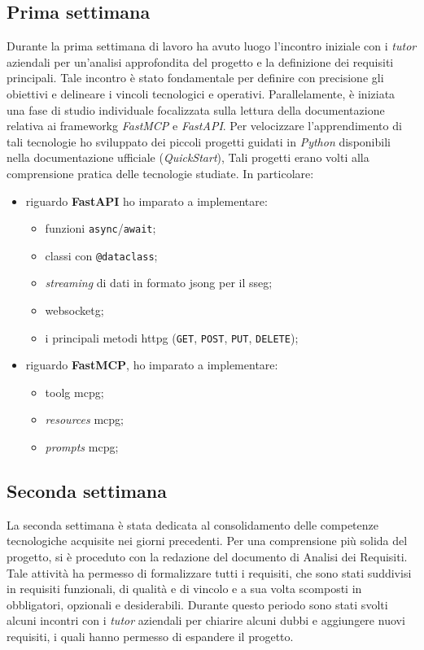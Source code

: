 \subsection{Prima settimana}
Durante la prima settimana di lavoro ha avuto luogo l'incontro iniziale con i 
\textit{tutor} aziendali per un'analisi approfondita del progetto e la definizione 
dei requisiti principali. Tale incontro è stato fondamentale per definire con precisione 
gli obiettivi e delineare i vincoli tecnologici e operativi. 
Parallelamente, è iniziata una fase di studio individuale focalizzata 
sulla lettura della documentazione relativa ai \gls{frameworkg} 
\textit{FastMCP} e \textit{FastAPI}. Per velocizzare l'apprendimento di tali 
tecnologie ho sviluppato dei piccoli progetti guidati in \textit{Python} 
disponibili nella documentazione ufficiale (\textit{QuickStart}), 
Tali progetti erano volti alla comprensione pratica delle tecnologie 
studiate. In particolare:
\begin{itemize}
    \item riguardo \textbf{FastAPI} ho imparato a implementare:
        \begin{itemize}
            \item funzioni \texttt{async}/\texttt{await};
            \item classi con \texttt{@dataclass};
            \item \textit{streaming} di dati in formato \gls{jsong} per il \gls{sseg}\glsfirstoccur ;
            \item \gls{websocketg};
            \item i principali metodi \gls{httpg} (\texttt{GET}, \texttt{POST}, 
            \texttt{PUT}, \texttt{DELETE});
        \end{itemize}
    \item riguardo \textbf{FastMCP}, ho imparato a implementare:
        \begin{itemize}
            \item \gls{toolg} \gls{mcpg};
            \item \textit{resources} \gls{mcpg};
            \item \textit{prompts} \gls{mcpg};
        \end{itemize}
\end{itemize}


\subsection{Seconda settimana}
La seconda settimana è stata dedicata al consolidamento delle competenze tecnologiche 
acquisite nei giorni precedenti. Per una comprensione più solida del progetto, si è 
proceduto con la redazione del documento di Analisi dei Requisiti. Tale attività ha 
permesso di formalizzare tutti i requisiti, che sono stati suddivisi in requisiti funzionali,
di qualità e di vincolo e a sua volta scomposti in obbligatori, opzionali e desiderabili.
Durante questo periodo sono 
stati svolti alcuni incontri con i \textit{tutor} aziendali per chiarire alcuni dubbi
e aggiungere nuovi requisiti, i quali hanno permesso di espandere il progetto.

